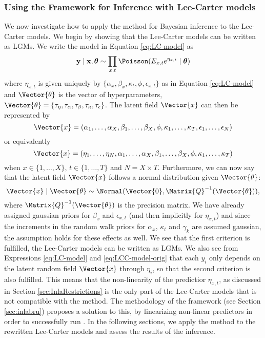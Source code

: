 \subsubsection{Using the \inla Framework for Inference with Lee-Carter models}
\newpar We now investigate how to apply the \inla method for Bayesian inference to the Lee-Carter models. We begin by showing that the Lee-Carter models can be written as LGMs. We write the model in Equation \ref{eq:LC-model} as 
\begin{equation}
    \textbf{y}\mid \textbf{x}, \boldsymbol{\theta} \sim \prod_{x,t}\Poisson(E_{x,t}e^{\eta_{x,t}}\mid \boldsymbol{\theta})
\end{equation}
where $\eta_{x,t}$ is given uniquely by $\{\alpha_x, \beta_x, \kappa_t, \phi, \epsilon_{x,t}\}$ as in Equation \ref{eq:LC-model} and $\Vector{\theta}$ is the vector of hyperparameters, $\Vector{\theta} = \{\tau_{\eta}, \tau_{\alpha}, \tau_{\beta}, \tau_{\kappa}, \tau_\epsilon\}$. The latent field $\Vector{x}$ can then be represented by 
\begin{equation*}
    \Vector{x} = (\alpha_1,\ldots,\alpha_X,\beta_1,\ldots,\beta_X, \phi, \kappa_1,\ldots, \kappa_T, \epsilon_1, \ldots, \epsilon_N)
\end{equation*}
or equivalently 
\begin{equation}
    \Vector{x} = (\eta_1,\ldots,\eta_N,\alpha_1,\ldots,\alpha_X,\beta_1,\ldots,\beta_X, \phi, \kappa_1,\ldots, \kappa_T)
    \label{eq:LChyperparams}
\end{equation}
when $x\in \{1,\ldots,X\}$, $t\in\{1,\ldots,T\}$ and $N=X\times T$. Furthermore, we can now say that the latent field $\Vector{x}$ follows a normal distribution given $\Vector{\theta}$:
\begin{equation}
        \Vector{x}\mid \Vector{\theta} \sim \Normal(\Vector{0}, \Matrix{Q}^{-1}(\Vector{\theta})),
        \label{eq:XNormalDist}
\end{equation}
where $\Matrix{Q}^{-1}(\Vector{\theta})$ is the precision matrix. We have already assigned gaussian priors for $\beta_x$ and $\epsilon_{x,t}$ (and then implicitly for $\eta_{x,t}$) and since the increments in the random walk priors for $\alpha_x$, $\kappa_t$ and $\gamma_k$ are assumed gaussian, the assumption holds for these effects as well. 
\newline
We see that the first criterion is fulfilled, the Lee-Carter models can be written as LGMs. We also see from Expressions \ref{eq:LC-model} and \ref{eq:LCC-model-orig} that each $y_i$ only depends on the latent random field $\Vector{x}$ through $\eta_i$, so that the second criterion is also fulfilled. This means that the non-linearity of the predictior $\eta_{x,t}$, as discussed in Section \ref{sec:InlaRestrictions} is the only part of the Lee-Carter models that is not compatible with the \inla method. The methodology of the \inlabru framework (see Section \ref{sec:inlabru}) proposes a solution to this, by linearizing non-linear predictors in order to successfully run \inla. In the following sections, we apply the \inlabru method to the rewritten Lee-Carter models and assess the results of the inference. 